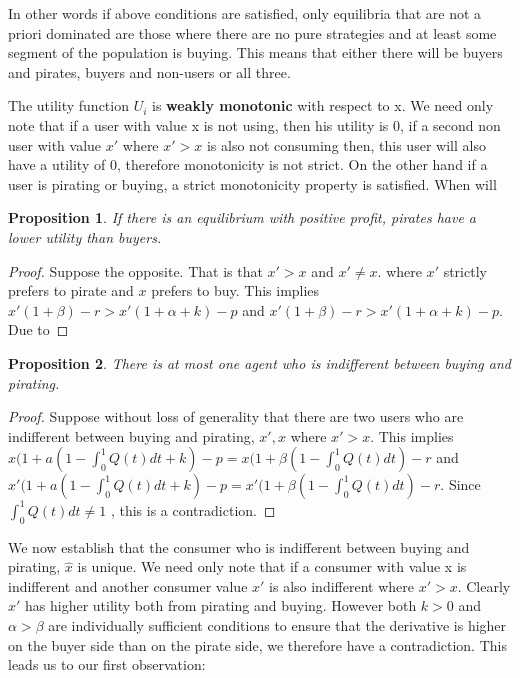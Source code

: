 \documentclass{article}
\newtheorem{proposition}{Proposition}
\begin{document}
In other words if above conditions are satisfied, only equilibria that are not a priori dominated are those where there are no pure strategies and at least some segment of the population is buying. This means that either there will be buyers and pirates, buyers and non-users or all three. 

The utility function $U_i$ is \textbf{weakly monotonic}  with respect to x. We need only note that if a user with value x is not using, then his utility is 0, if a second non user with value $x'$ where $x'>x$ is also not consuming then, this user will also have a utility of 0, therefore monotonicity is not strict. On the other hand if a user is pirating or buying, a strict monotonicity property is satisfied. When will 

\begin{proposition}
If there is an equilibrium with positive profit, pirates have a lower utility than buyers. 
\end{proposition} 

\begin{proof}
Suppose the opposite. That is that $x'>x$ and $x' \neq x$. where $x'$ strictly prefers to pirate and $x$ prefers to buy. This implies $x'(1+\beta)-r>x'(1+\alpha+k)-p$ and $x'(1+\beta)-r>x'(1+\alpha+k)-p$. Due to 
\end{proof}

\begin{proposition}
There is at most one agent who is indifferent between buying and pirating.
\end{proposition}

\begin{proof}
Suppose without loss of generality that there are two users who are indifferent between buying and pirating, $x',x$ where $x'>x$. This implies $x(1+a(1-\int^1_0 Q(t)dt+k)-p=x(1+\beta(1-\int^1_0 Q(t)dt)-r$ and $x'(1+a(1-\int^1_0 Q(t)dt+k)-p=x'(1+\beta(1-\int^1_0 Q(t)dt)-r$. Since $\int^1_0 Q(t)dt \neq 1$ , this is a contradiction. 
\end{proof}

We now establish that the consumer who is indifferent between buying and pirating, $\hat{x}$ is unique. We need only note that if a consumer with value x is indifferent and another consumer value $x'$ is also indifferent where $x'>x$. Clearly $x'$ has higher utility both from pirating and buying. However both $k>0$ and $\alpha>\beta$ are individually sufficient conditions to ensure that the derivative is higher on the buyer side than on the pirate side, we therefore have a contradiction. This leads us to our first observation:
\end{document}
